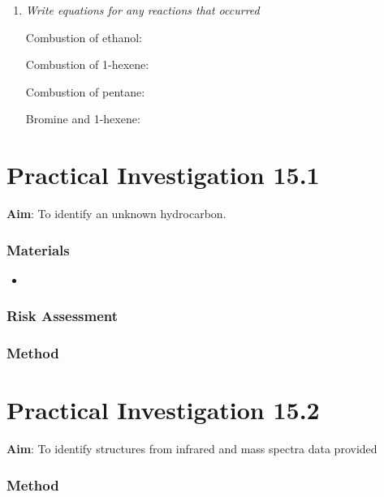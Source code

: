 \documentclass{report}
\begin{document}
\begin{enumerate}
\begin{enumerate}
				\item \textit{Write equations for any reactions that occurred}

					Combustion of ethanol: 

					Combustion of 1-hexene: 

					Combustion of pentane: 

					Bromine and 1-hexene: 

			\end{enumerate}



	\end{enumerate}

\section*{Practical Investigation 15.1}

	\textbf{Aim}: To identify an unknown hydrocarbon.

	\subsubsection{Materials}
	
		\begin{itemize}
			\item 
		\end{itemize}

	\subsubsection{Risk Assessment}
	
	\subsubsection{Method}
	
\section*{Practical Investigation 15.2}

	\textbf{Aim}: To identify structures from infrared and mass spectra data provided

	\subsubsection{Method}
	
\end{document}
